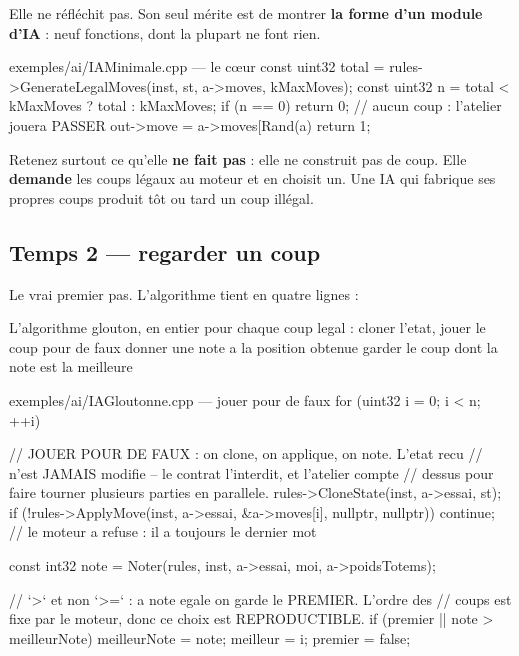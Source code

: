 Elle ne réfléchit pas. Son seul mérite est de montrer \textbf{la forme d'un
module d'IA} : neuf fonctions, dont la plupart ne font rien.

\begin{nkcode}{exemples/ai/IAMinimale.cpp — le cœur}
const uint32 total = rules->GenerateLegalMoves(inst, st, a->moves, kMaxMoves);
const uint32 n     = total < kMaxMoves ? total : kMaxMoves;
if (n == 0) return 0;          // aucun coup : l'atelier jouera PASSER
out->move = a->moves[Rand(a) %
return 1;
\end{nkcode}

Retenez surtout ce qu'elle \textbf{ne fait pas} : elle ne construit pas de coup.
Elle \textbf{demande} les coups légaux au moteur et en choisit un. Une IA qui
fabrique ses propres coups produit tôt ou tard un coup illégal.

\subsection{Temps 2 — regarder un coup}

Le vrai premier pas. L'algorithme tient en quatre lignes :

\begin{nkcode}{L'algorithme glouton, en entier}
pour chaque coup legal :
    cloner l'etat, jouer le coup pour de faux
    donner une note a la position obtenue
garder le coup dont la note est la meilleure
\end{nkcode}

\begin{nkcode}{exemples/ai/IAGloutonne.cpp — jouer pour de faux}
for (uint32 i = 0; i < n; ++i) {
    // JOUER POUR DE FAUX : on clone, on applique, on note. L'etat recu
    // n'est JAMAIS modifie -- le contrat l'interdit, et l'atelier compte
    // dessus pour faire tourner plusieurs parties en parallele.
    rules->CloneState(inst, a->essai, st);
    if (!rules->ApplyMove(inst, a->essai, &a->moves[i], nullptr, nullptr))
        continue;   // le moteur a refuse : il a toujours le dernier mot

    const int32 note = Noter(rules, inst, a->essai, moi, a->poidsTotems);

    // `>` et non `>=` : a note egale on garde le PREMIER. L'ordre des
    // coups est fixe par le moteur, donc ce choix est REPRODUCTIBLE.
    if (premier || note > meilleurNote) {
        meilleurNote = note; meilleur = i; premier = false;
    }
}
\end{nkcode}

